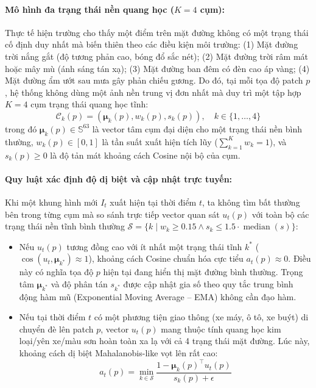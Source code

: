 \documentclass[11pt,a4paper]{article}
\begin{document}
\paragraph{Mô hình đa trạng thái nền quang học ($K = 4$ cụm):} 
Thực tế hiện trường cho thấy một điểm trên mặt đường không có một trạng thái cố định duy nhất mà biến thiên theo các điều kiện môi trường: (1) Mặt đường trời nắng gắt (độ tương phản cao, bóng đổ sắc nét); (2) Mặt đường trời râm mát hoặc mây mù (ánh sáng tán xạ); (3) Mặt đường ban đêm có đèn cao áp vàng; (4) Mặt đường ẩm ướt sau mưa gây phản chiếu gương.
Do đó, tại mỗi tọa độ patch $p$, hệ thống không dùng một ảnh nền trung vị đơn nhất mà duy trì một tập hợp $K = 4$ cụm trạng thái quang học tĩnh:
\begin{equation}
    \mathcal{C}_k(p) = \left( \bm{\mu}_k(p), w_k(p), s_k(p) \right), \quad k \in \{1, \dots, 4\}
\end{equation}
trong đó $\bm{\mu}_k(p) \in \mathbb{S}^{63}$ là vector tâm cụm đại diện cho một trạng thái nền bình thường, $w_k(p) \in [0, 1]$ là tần suất xuất hiện tích lũy ($\sum_{k=1}^K w_k = 1$), và $s_k(p) \ge 0$ là độ tản mát khoảng cách Cosine nội bộ của cụm.

\paragraph{Quy luật xác định độ dị biệt và cập nhật trực tuyến:}
Khi một khung hình mới $I_t$ xuất hiện tại thời điểm $t$, ta không tìm bất thường bên trong từng cụm mà so sánh trực tiếp vector quan sát $u_t(p)$ với toàn bộ các trạng thái nền tĩnh bình thường $\mathcal{S} = \{k \mid w_k \ge 0.15 \land s_k \le 1.5 \cdot \operatorname{median}(s)\}$:
\begin{itemize}
    \item Nếu $u_t(p)$ tương đồng cao với ít nhất một trạng thái tĩnh $k^*$ ($\cos(u_t, \bm{\mu}_{k^*}) \approx 1$), khoảng cách Cosine chuẩn hóa cực tiểu $a_t(p) \approx 0$. Điều này có nghĩa tọa độ $p$ hiện tại đang hiển thị mặt đường bình thường. Trọng tâm $\bm{\mu}_{k^*}$ và độ phân tán $s_{k^*}$ được cập nhật gia số theo quy tắc trung bình động hàm mũ (Exponential Moving Average -- EMA) không cần đạo hàm.
    \item Nếu tại thời điểm $t$ có một phương tiện giao thông (xe máy, ô tô, xe buýt) di chuyển đè lên patch $p$, vector $u_t(p)$ mang thuộc tính quang học kim loại/yên xe/màu sơn hoàn toàn xa lạ với cả 4 trạng thái mặt đường. Lúc này, khoảng cách dị biệt Mahalanobis-like vọt lên rất cao:
    \begin{equation}
        a_t(p) = \min_{k \in \mathcal{S}} \frac{1 - \bm{\mu}_k(p)^\top u_t(p)}{s_k(p) + \epsilon}
    \end{equation}
\end{itemize}
\end{document}
